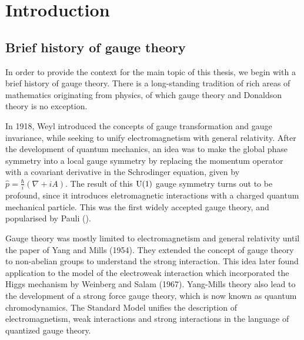 \chapter*{Introduction}


\section*{Brief history of gauge theory}
In order to provide the context for the main topic of this thesis, we begin with
a brief history of gauge theory. There is a long-standing tradition of rich
areas of mathematics originating from physics, of which gauge theory and
Donaldson theory is no exception.

In 1918, Weyl introduced the concepts of gauge transformation and gauge
invariance, while seeking to unify electromagnetism with general relativity. After the
development of quantum mechanics, an idea was to make the global phase symmetry
into a local gauge symmetry by replacing the momentum operator with a covariant 
derivative in the Schrodinger equation, given by 
$\widehat{p}=\frac{\hbar}{i}(\nabla+iA)$. The result of this $\operatorname{U}(1)$ gauge symmetry
turns out to be profound, since it introduces eletromagnetic interactions with a charged
quantum mechanical particle. This was the first widely accepted gauge theory,
and popularised by Pauli (\citeyear{pauli_em}).\cite{pauli_em}

Gauge theory was mostly limited to electromagnetism and general relativity until 
the paper of Yang and Mills (1954). They extended the concept of gauge theory 
to non-abelian groups 
to understand the strong interaction. This idea later found
application to the model of the electroweak interaction which incorporated the 
Higgs mechanism by Weinberg and Salam (1967).
Yang-Mills theory also lead to the development of a strong force gauge theory, 
which is now known as quantum chromodynamics. The Standard Model unifies the description of
electromagnetism, weak interactions and strong interactions in the language of
quantized gauge theory. 
\begin{comment}
Since symmetries of spacetime and fields are
central to classification and predicting properties of particles, the search for
a non-trivial extension of the Poincare group lead to supersymmetry being 
independently discovered in 1971 by multiple physicists. It became increasingly
popular for its potential to provide an elegant solution to unsolved problems in
particle physics, such as the hierarchy problem, grand unification and dark
matter. 
\end{comment}

